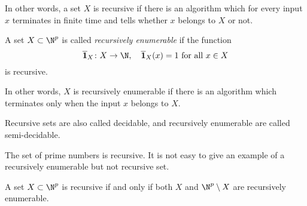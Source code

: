 \begin{page}
\setcounter{section}{3}
\setcounter{subsection}{4}
\setcounter{dfn}{26}
\label{portion:657}

In other words, a set $X$ is recursive if there is an algorithm which for every input $x$ terminates in finite time and tells whether $x$ belongs to $X$ or not.


\end{page}

\begin{page}
\setcounter{section}{3}
\setcounter{subsection}{4}
\setcounter{dfn}{27}
\label{portion:659}

\begin{dfn}
A set $X \subset \N^p$ is called \emph{recursively enumerable} if the function
\[
\overline{\mathbf{1}}_X \colon X \to \N, \quad \overline{\mathbf{1}}_X(x) = 1 \text{ for all }x \in X
\]
is recursive.
\end{dfn}

\end{page}

\begin{page}
\setcounter{section}{3}
\setcounter{subsection}{4}
\setcounter{dfn}{27}
\label{portion:660}

In other words, $X$ is recursively enumerable if there is an algorithm which terminates only when the input $x$ belongs to $X$.

Recursive sets are also called decidable, and recursively enumerable are called semi-decidable.


\end{page}

\begin{page}
\setcounter{section}{3}
\setcounter{subsection}{4}
\setcounter{dfn}{28}
\label{portion:662}

\begin{exl}
The set of prime numbers is recursive.
It is not easy to give an example of a recursively enumerable but not recursive set.
\end{exl}

\end{page}

\begin{page}
\setcounter{section}{3}
\setcounter{subsection}{4}
\setcounter{dfn}{29}
\label{portion:665}

\begin{lem}
A set $X \subset \N^p$ is recursive if and only if both $X$ and $\N^p \setminus X$ are recursively enumerable.
\end{lem}

\end{page}

